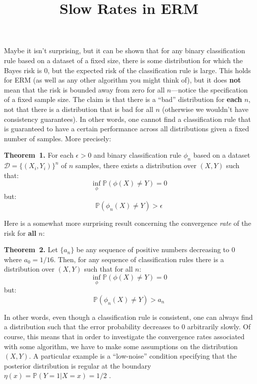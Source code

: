 \documentclass[12pt]{article}
\title{Slow Rates in ERM}
\newenvironment{theorem}[1][]{\par\medskip
   \noindent \textbf{Theorem~#1.} \rmfamily}{\medskip}
\begin{document}
\maketitle

Maybe it isn't surprising, but it can be shown that for any
binary classification rule based on a dataset of a fixed size, there
is some distribution for which the Bayes risk is $0$, but the expected risk of
the classification rule is large. This holds for ERM (as well as any other
algorithm you might think of), but it does \textbf{not} mean that the risk is
bounded away from zero for all $n$---notice the specification of a fixed
sample size. The claim is that there is a ``bad'' distribution for
\textbf{each} $n$, not that there is a distribution that is bad
for all $n$ (otherwise we wouldn't have consistency guarantees). In
other words, one cannot find a classification rule that is guaranteed
to have a certain performance across all distributions given a fixed
number of samples. More precisely:

\begin{theorem}[1]
  For each $\epsilon > 0$ and binary classification rule $\phi_n$ based on a dataset \(\mathcal{D} =
  \{(X_i, Y_i)\}^n\) of $n$ samples, there exists a distribution over
  $(X, Y)$ such that:
  \[\inf_\phi\mathbb{P}(\phi(X) \neq Y) = 0\]
  but:
  \[\mathbb{P}(\phi_n(X) \neq Y) > \epsilon\]

\end{theorem}

Here is a somewhat more surprising result concerning the convergence \textit{rate}
of the risk for \textbf{all} $n$:

\begin{theorem}[2]
  Let $\{a_n\}$ be any sequence of positive numbers decreasing to $0$
  where $a_0=1/16$. Then, for any sequence of classification rules
  there is a distribution over $(X, Y)$ such that for all $n$:
  \[\inf_\phi\mathbb{P}(\phi(X) \neq Y) = 0\]
  but:
  \[\mathbb{P}(\phi_n(X) \neq Y) > a_n\]
\end{theorem}

In other words, even though a classification rule is consistent, one
can always find a distribution such that the error probability
decreases to $0$ arbitrarily slowly. Of course, this means that in order
to investigate the convergence rates associated with some algorithm,
we have to make some assumptions on the distribution $(X, Y)$. A
particular example is a ``low-noise'' condition specifying that the
posterior distribution is regular at the boundary $\eta(x) =
\mathbb{P}(Y =1 | X=x) = 1/2$ \cite{bartlett-2006-risk}.
\end{document}
